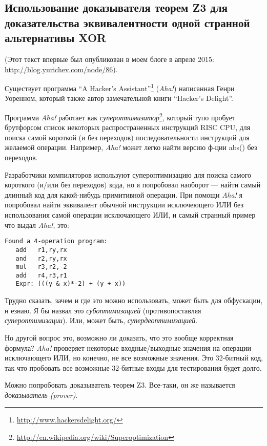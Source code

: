 \subsection{Использование доказывателя теорем Z3 для доказательства эквивалентности одной странной альтернативы XOR}
\label{weird_XOR}

(Этот текст впервые был опубликован в моем блоге в апреле 2015: \url{http://blog.yurichev.com/node/86}).

Существует программа ``A Hacker's Assistant''\footnote{\url{http://www.hackersdelight.org/}}
(\textit{Aha!}) написанная Генри Уоренном, который также автор замечательной книги
``Hacker's Delight''.

Программа \textit{Aha!} работает как \textit{супероптимизатор}\footnote{\url{http://en.wikipedia.org/wiki/Superoptimization}},
который тупо пробует брутфорсом список некоторых распространенных инструкций RISC CPU, для поиска самой короткой
(и без переходов) последовательности инструкций для желаемой операции.
Например, \textit{Aha!} может легко найти версию ф-ции abs() без переходов.

Разработчики компиляторов используют супероптимизацию для поиска самого короткого (и/или без переходов) кода,
но я попробовал наоборот --- найти самый длинный код для какой-нибудь примитивной операции.
При помощи \textit{Aha!} я попробовал найти эквивалент обычной инструкции исключеющего ИЛИ без использования самой
операции исключающего ИЛИ, и самый странный пример что выдал \textit{Aha!}, это:

\begin{lstlisting}
Found a 4-operation program:
   add   r1,ry,rx
   and   r2,ry,rx
   mul   r3,r2,-2
   add   r4,r3,r1
   Expr: (((y & x)*-2) + (y + x))
\end{lstlisting}

Трудно сказать, зачем и где это можно использовать, может быть для обфускации, н езнаю.
Я бы назвал это \textit{субоптимизацией} (противопоставляя \textit{супероптимизации}).
Или, может быть, \textit{супердеоптимизацией}.

Но другой вопрос это, возможно ли доказать, что это вообще корректная формула?
\textit{Aha!} проверяет некоторые входные/выходные значения на операции исключающего ИЛИ, но конечно, не все
возможные значения.
Это 32-битный код, так что пробовать все возможные 32-битные входы для тестирования будет долго.

Можно попробовать доказыватель теорем Z3. Все-таки, он же называется \textit{доказыватель (prover)}.

